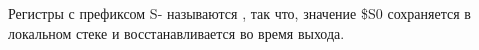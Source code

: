 


Регистры с префиксом S- называются , так что, значение \$S0 сохраняется 
в локальном стеке и восстанавливается во время выхода.

